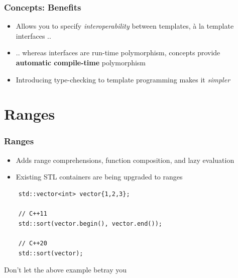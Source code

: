 \documentclass{beamer}
\begin{document}
\begin{frame}
\frametitle{Concepts: Benefits}

\begin{itemize}
 \setlength\itemsep{2em}
\item Allows you to specify \emph{interoperability} between templates, à la template interfaces ..
\item .. whereas interfaces are run-time polymorphism, concepts provide \textbf{automatic compile-time} polymorphism
\item Introducing type-checking to template programming makes it \textit{simpler}
\end{itemize}

\end{frame}


\section{Ranges}
\begin{frame}[fragile]
\frametitle{Ranges}
\begin{itemize}
\item Adds range comprehensions, function composition, and lazy evaluation
\item Existing STL containers are being upgraded to ranges
\end{itemize}

\begin{lstlisting}
    std::vector<int> vector{1,2,3};
    
    // C++11
    std::sort(vector.begin(), vector.end());
    
    // C++20
    std::sort(vector);
\end{lstlisting}

\vspace{2em}
Don't let the above example betray you

\end{frame}

\end{document}
